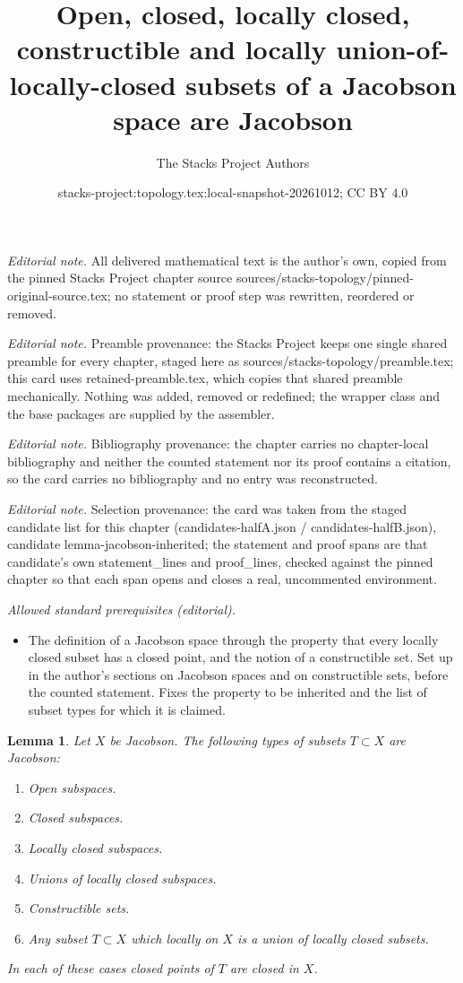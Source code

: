 \documentclass[10pt,a4paper]{amsart}
\title{Open, closed, locally closed, constructible and locally union-of-locally-closed subsets of a Jacobson space are Jacobson}
\author{The Stacks Project Authors}
\date{stacks-project:topology.tex:local-snapshot-20261012; CC BY 4.0}
\theoremstyle{plain}
\newtheorem{lemma}[subsection]{Lemma}
\theoremstyle{definition}
\theoremstyle{remark}
\numberwithin{equation}{subsection}
\begin{document}
\maketitle
\noindent\textit{Editorial note.} All delivered mathematical text is the author's own, copied from the pinned Stacks Project chapter source sources/stacks-topology/pinned-original-source.tex; no statement or proof step was rewritten, reordered or removed.\par\medskip
\noindent\textit{Editorial note.} Preamble provenance: the Stacks Project keeps one single shared preamble for every chapter, staged here as sources/stacks-topology/preamble.tex; this card uses retained-preamble.tex, which copies that shared preamble mechanically. Nothing was added, removed or redefined; the wrapper class and the base packages are supplied by the assembler.\par\medskip
\noindent\textit{Editorial note.} Bibliography provenance: the chapter carries no chapter-local bibliography and neither the counted statement nor its proof contains a citation, so the card carries no bibliography and no entry was reconstructed.\par\medskip
\noindent\textit{Editorial note.} Selection provenance: the card was taken from the staged candidate list for this chapter (candidates-halfA.json / candidates-halfB.json), candidate lemma-jacobson-inherited; the statement and proof spans are that candidate's own statement\_lines and proof\_lines, checked against the pinned chapter so that each span opens and closes a real, uncommented environment.\par\medskip
\noindent\textit{Allowed standard prerequisites (editorial).}\begin{itemize}
\item The definition of a Jacobson space through the property that every locally closed subset has a closed point, and the notion of a constructible set. Set up in the author's sections on Jacobson spaces and on constructible sets, before the counted statement. Fixes the property to be inherited and the list of subset types for which it is claimed.
\end{itemize}\medskip
\begin{lemma}
\label{lemma-jacobson-inherited}
Let $X$ be Jacobson. The following types of subsets $T \subset X$
are Jacobson:
\begin{enumerate}
\item Open subspaces.
\item Closed subspaces.
\item Locally closed subspaces.
\item Unions of locally closed subspaces.
\item Constructible sets.
\item Any subset $T \subset X$ which locally on $X$
is a union of locally closed subsets.
\end{enumerate}
In each of these cases closed points of $T$ are
closed in $X$.
\end{lemma}
\end{document}

